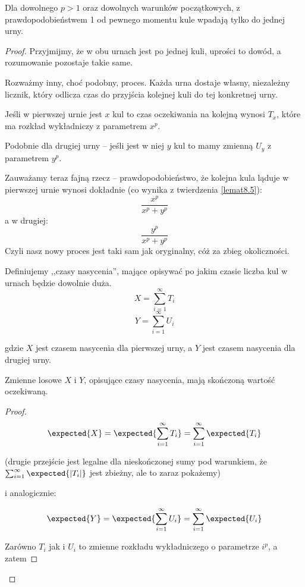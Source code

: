 \begin{theorem}
	Dla dowolnego \( p > 1 \) oraz dowolnych warunków początkowych, z prawdopodobieństwem 1 od pewnego momentu kule wpadają tylko do jednej urny.
\end{theorem}
\begin{proof}
	Przyjmijmy, że w obu urnach jest po jednej kuli, uprości to dowód, a rozumowanie pozostaje takie same.

	Rozważmy inny, choć podobny, proces.
	Każda urna dostaje własny, niezależny licznik, który odlicza czas do przyjścia kolejnej kuli do tej konkretnej urny.

	Jeśli w pierwszej urnie jest \( x \) kul to czas oczekiwania na kolejną wynosi \( T_x \), które ma rozkład wykładniczy z parametrem \( x^p \).

	Podobnie dla drugiej urny -- jeśli jest w niej \( y \) kul to mamy zmienną \( U_y \) z parametrem \( y^p \).

	Zauważamy teraz fajną rzecz -- prawdopodobieństwo, że kolejna kula ląduje w pierwszej urnie wynosi dokładnie (co wynika z twierdzenia \ref{lemat8.5}):
	\[
		\frac{x^p}{x^p + y^p}
	\]
	a w drugiej:
	\[
		\frac{y^p}{x^p + y^p}
	\]
	Czyli nasz nowy proces jest taki sam jak oryginalny, cóż za zbieg okoliczności.

	Definiujemy ,,czasy nasycenia'', mające opisywać po jakim czasie liczba kul w urnach będzie dowolnie duża.
	\[
		X = \sum_{i=1}^\infty T_i
	\]
	\[
		Y = \sum_{i=1}^\infty U_i
	\]

	gdzie \(X\) jest czasem nasycenia dla pierwszej urny, a \(Y\) jest czasem nasycenia dla drugiej urny.

	\begin{lemma}
		Zmienne losowe \(X\) i \(Y\), opisujące czasy nasycenia, mają skończoną wartość oczekiwaną.
	\end{lemma}

	\begin{proof}

		\[
			\expected{X} = \expected{\sum_{i=1}^{\infty} T_i} = \sum_{i=1}^{\infty} \expected{T_i}
		\]

		(drugie przejście jest legalne dla nieskończonej sumy pod warunkiem, że \( \sum_{i=1}^{\infty} \expected{|T_i| }\) jest zbieżny, ale to zaraz pokażemy)

		i analogicznie:

		\[
			\expected{Y} = \expected{\sum_{i=1}^{\infty} U_i} = \sum_{i=1}^{\infty} \expected{U_i}
		\]

		Zarówno \(T_i\) jak i \(U_i\) to zmienne rozkładu wykładniczego o parametrze \(i^p\), a zatem


\end{proof}
\end{proof}
